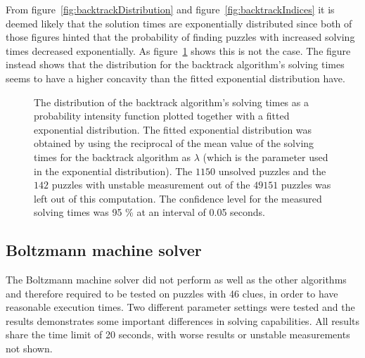 \documentclass[a4paper,11pt]{kth-mag}
\begin{document}
\FloatBarrier
From figure~\ref{fig:backtrackDistribution} and figure~\ref{fig:backtrackIndices} it is deemed likely that the solution times are exponentially distributed since both of those figures hinted that the probability of finding puzzles with increased solving times decreased exponentially.
As figure~\ref{fig:backtrackExponential} shows this is not the case.
The figure instead shows that the distribution for the backtrack algorithm's solving times seems to have a higher concavity than the fitted exponential distribution have.

\begin{figure}[here] 
\noindent{}
\vspace{-15pt}
\caption[Backtrack solving times as a probability intensity function]{The distribution of the backtrack algorithm's solving times as a probability intensity function plotted together with a fitted exponential distribution. 
The fitted exponential distribution was obtained by using the reciprocal of the mean value of the solving times for the backtrack algorithm as $\lambda$ (which is the parameter used in the exponential distribution). 
The $1150$ unsolved puzzles and the $142$ puzzles with unstable measurement out of the $49151$ puzzles was left out of this computation. 
The confidence level for the measured solving times was 95 \% at an interval of 0.05 seconds.}
\label{fig:backtrackExponential}
\end{figure}

\FloatBarrier
\subsection{Boltzmann machine solver}
The Boltzmann machine solver did not perform as well as the other algorithms and therefore required to be tested on puzzles with 46 clues, in order to have reasonable execution times.
Two different parameter settings were tested and the results demonstrates some important differences in solving capabilities.
All results share the time limit of 20 seconds, with worse results or unstable measurements not shown.
\end{document}
